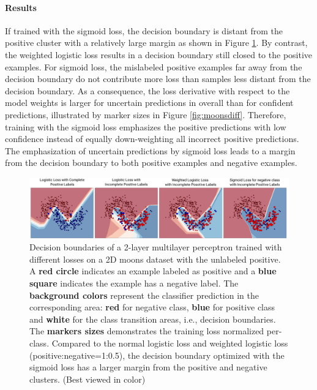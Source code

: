 \paragraph{Results}
If trained with the sigmoid loss, the decision boundary is distant from the positive cluster with a relatively large margin as shown in Figure \ref{fig:moons}.
By contrast, the weighted logistic loss results in a decision boundary still closed to the positive examples.
For sigmoid loss, the mislabeled positive examples far away from the decision boundary do not contribute more loss than samples less distant from the decision boundary.
As a consequence, the loss derivative with respect to the model weights is larger for uncertain predictions in overall than for confident predictions, illustrated by marker sizes in Figure \ref{fig:moonsdiff}.
Therefore, training with the sigmoid loss emphasizes the positive predictions with low confidence instead of equally down-weighting all incorrect positive predictions.
The emphasization of uncertain predictions by sigmoid loss leads to a margin from the decision boundary to both positive examples and negative examples.


\begin{figure}
\begin{center}
   \includegraphics[width=0.95\linewidth]{img/moons.pdf}
\end{center}
   \caption{
   Decision boundaries of a 2-layer multilayer perceptron trained with different losses on a 2D moons dataset with the unlabeled positive.
   A \textbf{red circle} indicates an example labeled as positive and a \textbf{blue square} indicates the example has a negative label.
   The \textbf{background colors} represent the classifier prediction in the corresponding area: \textbf{red} for negative class, \textbf{blue} for positive class and \textbf{white} for the class transition areas, i.e., decision boundaries.
   The \textbf{markers sizes} demonstrates the training loss normalized per-class.
   Compared to the normal logistic loss and weighted logistic loss (positive:negative=1:0.5), the decision boundary optimized with the sigmoid loss has a larger margin from the positive and negative clusters.
   (Best viewed in color)
   }
\label{fig:moons}
\end{figure}


